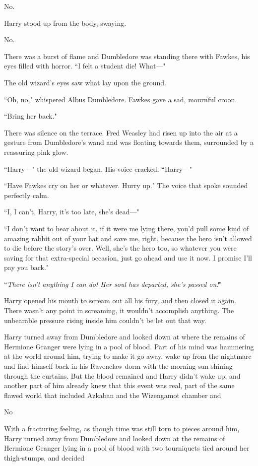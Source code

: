 No.

Harry stood up from the body, swaying.

No.

There was a burst of flame and Dumbledore was standing there with Fawkes, his eyes filled with horror. ``I felt a student die! What—"

The old wizard's eyes saw what lay upon the ground.

``Oh, no," whispered Albus Dumbledore. Fawkes gave a sad, mournful croon.

``Bring her back."

There was silence on the terrace. Fred Weasley had risen up into the air at a gesture from Dumbledore's wand and was floating towards them, surrounded by a reassuring pink glow.

``Harry—" the old wizard began. His voice cracked. ``Harry—"

``Have Fawkes cry on her or whatever. Hurry up." The voice that spoke sounded perfectly calm.

``I, I can't, Harry, it's too late, she's dead—"

``I don't want to hear about it. if it were me lying there, you'd pull some kind of amazing rabbit out of your hat and save me, right, because the hero isn't allowed to die before the story's over. Well, she's the hero too, so whatever you were saving for that extra-special occasion, just go ahead and use it now. I promise I'll pay you back."

``\emph{There isn't anything I can do! Her soul has departed, she's passed on!}"

Harry opened his mouth to scream out all his fury, and then closed it again. There wasn't any point in screaming, it wouldn't accomplish anything. The unbearable pressure rising inside him couldn't be let out that way.

Harry turned away from Dumbledore and looked down at where the remains of Hermione Granger were lying in a pool of blood. Part of his mind was hammering at the world around him, trying to make it go away, wake up from the nightmare and find himself back in his Ravenclaw dorm with the morning sun shining through the curtains. But the blood remained and Harry didn't wake up, and another part of him already knew that this event was real, part of the same flawed world that included Azkaban and the Wizengamot chamber and

No

With a fracturing feeling, as though time was still torn to pieces around him, Harry turned away from Dumbledore and looked down at the remains of Hermione Granger lying in a pool of blood with two tourniquets tied around her thigh-stumps, and decided

